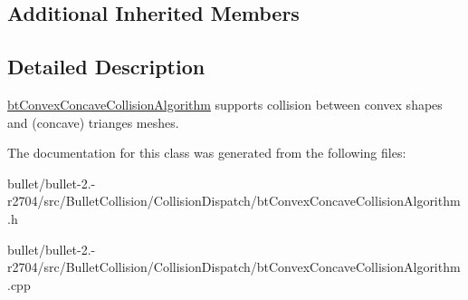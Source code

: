 \subsection*{Additional Inherited Members}


\subsection{Detailed Description}
\hyperlink{classbt_convex_concave_collision_algorithm}{bt\+Convex\+Concave\+Collision\+Algorithm} supports collision between convex shapes and (concave) trianges meshes. 

The documentation for this class was generated from the following files\+:\begin{DoxyCompactItemize}
\item 
bullet/bullet-\/2.-\/r2704/src/\+Bullet\+Collision/\+Collision\+Dispatch/bt\+Convex\+Concave\+Collision\+Algorithm.\+h\item 
bullet/bullet-\/2.-\/r2704/src/\+Bullet\+Collision/\+Collision\+Dispatch/bt\+Convex\+Concave\+Collision\+Algorithm.\+cpp\end{DoxyCompactItemize}
